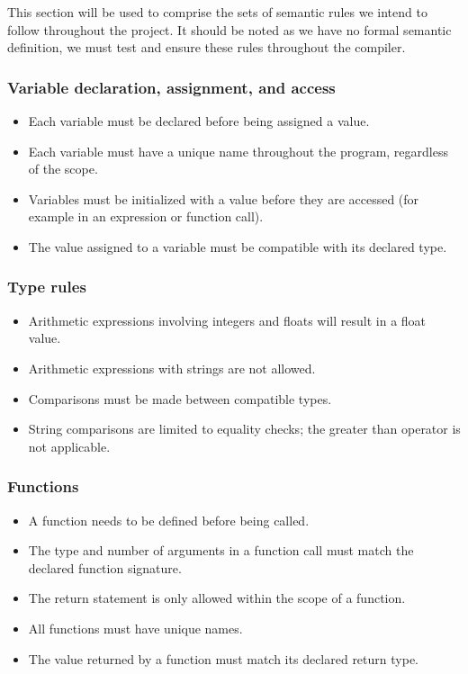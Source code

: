This section will be used to comprise the sets of semantic rules we intend to follow throughout the project.
It should be noted as we have no formal semantic definition, we must test and ensure these rules throughout the
compiler.

\subsubsection{Variable declaration, assignment, and access}

\begin{itemize}
    \item Each variable must be declared before being assigned a value.
    \item Each variable must have a unique name throughout the program, regardless of the scope.
    \item Variables must be initialized with a value before they are accessed (for example in an expression or function call).
    \item The value assigned to a variable must be compatible with its declared type.
\end{itemize}

\subsubsection{Type rules}

\begin{itemize}
    \item Arithmetic expressions involving integers and floats will result in a float value.
    \item Arithmetic expressions with strings are not allowed.
    \item Comparisons must be made between compatible types.
    \item String comparisons are limited to equality checks; the greater than operator is not applicable.
    \end{itemize}

\subsubsection{Functions}

\begin{itemize}
    \item A function needs to be defined before being called.
    \item The type and number of arguments in a function call must match the declared function signature.
    \item The return statement is only allowed within the scope of a function.
    \item All functions must have unique names.
    \item The value returned by a function must match its declared return type.
    \end{itemize}

